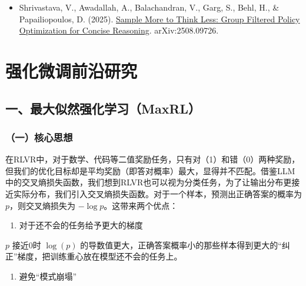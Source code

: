 \vspace{0.25em}
\begin{itemize}
\tightlist
\item
  Shrivastava, V., Awadallah, A., Balachandran, V., Garg, S., Behl, H., \& Papailiopoulos, D. (2025). \href{https://arxiv.org/abs/2508.09726}{Sample More to Think Less: Group Filtered Policy Optimization for Concise Reasoning}. arXiv:2508.09726.
\end{itemize}

\clearpage

\hypertarget{ux5f3aux5316ux5faeux8c03ux524dux6cbfux7814ux7a76}{%
\section{强化微调前沿研究}\label{ux5f3aux5316ux5faeux8c03ux524dux6cbfux7814ux7a76}}

\hypertarget{ux4e00ux6700ux5927ux4f3cux7136ux5f3aux5316ux5b66ux4e60maxrl}{%
\subsection{一、最大似然强化学习（MaxRL）}\label{ux4e00ux6700ux5927ux4f3cux7136ux5f3aux5316ux5b66ux4e60maxrl}}

\hypertarget{ux4e00ux6838ux5fc3ux601dux60f3-9}{%
\subsubsection{（一）核心思想}\label{ux4e00ux6838ux5fc3ux601dux60f3-9}}

在RLVR中，对于数学、代码等二值奖励任务，只有对（1）和错（0）两种奖励，但我们的优化目标却是平均奖励（即答对概率）最大，显得并不匹配。借鉴LLM中的交叉熵损失函数，我们想到RLVR也可以视为分类任务，为了让输出分布更接近实际分布，我们引入交叉熵损失函数。对于一个样本，预测出正确答案的概率为 \(p\)，则交叉熵损失为 \(-\log p\)。这带来两个优点：

\begin{enumerate}
\def\labelenumi{\arabic{enumi}.}
\tightlist
\item
  对于还不会的任务给予更大的梯度
\end{enumerate}

\(p\) 接近0时 \(\log(p)\) 的导数值更大，正确答案概率小的那些样本得到更大的``纠正''梯度，把训练重心放在模型还不会的任务上。

\begin{enumerate}
\def\labelenumi{\arabic{enumi}.}
\setcounter{enumi}{1}
\tightlist
\item
  避免``模式崩塌''
\end{enumerate}

